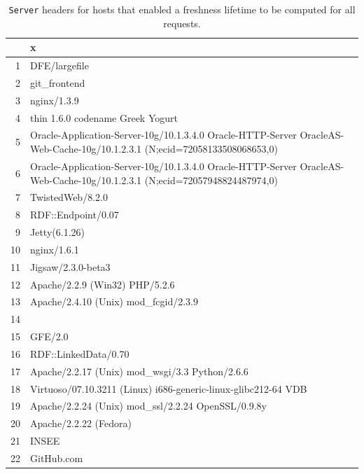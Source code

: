 \documentclass{llncs}
\newcommand{\httph}[1]{\texttt{#1}}
\begin{document}
\begin{table}[ht]
  \caption{\httph{Server} headers for hosts that enabled a freshness
    lifetime to be computed for all requests.}\label{tab:servers}
\begin{center}
\begin{tabular}{rl}
  \hline
 & x \\ 
  \hline
1 & DFE/largefile \\ 
  2 & git\_frontend \\ 
  3 & nginx/1.3.9 \\ 
  4 & thin 1.6.0 codename Greek Yogurt \\ 
  5 & Oracle-Application-Server-10g/10.1.3.4.0 Oracle-HTTP-Server OracleAS-Web-Cache-10g/10.1.2.3.1 (N;ecid=72058133508068653,0) \\ 
  6 & Oracle-Application-Server-10g/10.1.3.4.0 Oracle-HTTP-Server OracleAS-Web-Cache-10g/10.1.2.3.1 (N;ecid=72057948824487974,0) \\ 
  7 & TwistedWeb/8.2.0 \\ 
  8 & RDF::Endpoint/0.07 \\ 
  9 & Jetty(6.1.26) \\ 
  10 & nginx/1.6.1 \\ 
  11 & Jigsaw/2.3.0-beta3 \\ 
  12 & Apache/2.2.9 (Win32) PHP/5.2.6 \\ 
  13 & Apache/2.4.10 (Unix) mod\_fcgid/2.3.9 \\ 
  14 &  \\ 
  15 & GFE/2.0 \\ 
  16 & RDF::LinkedData/0.70 \\ 
  17 & Apache/2.2.17 (Unix) mod\_wsgi/3.3 Python/2.6.6 \\ 
  18 & Virtuoso/07.10.3211 (Linux) i686-generic-linux-glibc212-64  VDB \\ 
  19 & Apache/2.2.24 (Unix) mod\_ssl/2.2.24 OpenSSL/0.9.8y \\ 
  20 & Apache/2.2.22 (Fedora) \\ 
  21 & INSEE \\ 
  22 & GitHub.com \\ 
   \hline
\end{tabular}
\end{center}
\end{table}
\end{document}
